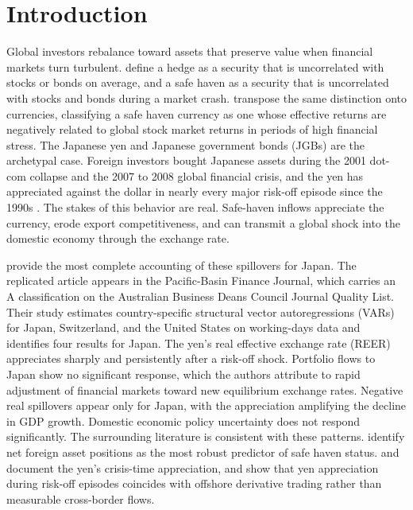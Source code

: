 \section{Introduction}

Global investors rebalance toward assets that preserve value when financial markets turn turbulent. \textcite{baur_lucey_2010} define a hedge as a security that is uncorrelated with stocks or bonds on average, and a safe haven as a security that is uncorrelated with stocks and bonds during a market crash. \textcite{hossfeld_macdonald_2014} transpose the same distinction onto currencies, classifying a safe haven currency as one whose effective returns are negatively related to global stock market returns in periods of high financial stress. The Japanese yen and Japanese government bonds (JGBs) are the archetypal case. Foreign investors bought Japanese assets during the 2001 dot-com collapse and the 2007 to 2008 global financial crisis, and the yen has appreciated against the dollar in nearly every major risk-off episode since the 1990s \parencite{beirne_sugandi_2023}. The stakes of this behavior are real. Safe-haven inflows appreciate the currency, erode export competitiveness, and can transmit a global shock into the domestic economy through the exchange rate.

\textcite{beirne_sugandi_2023} provide the most complete accounting of these spillovers for Japan. The replicated article appears in the Pacific-Basin Finance Journal, which carries an A classification on the Australian Business Deans Council Journal Quality List. Their study estimates country-specific structural vector autoregressions (VARs) for Japan, Switzerland, and the United States on working-days data and identifies four results for Japan. The yen's real effective exchange rate (REER) appreciates sharply and persistently after a risk-off shock. Portfolio flows to Japan show no significant response, which the authors attribute to rapid adjustment of financial markets toward new equilibrium exchange rates. Negative real spillovers appear only for Japan, with the appreciation amplifying the decline in GDP growth. Domestic economic policy uncertainty does not respond significantly. The surrounding literature is consistent with these patterns. \textcite{habib_stracca_2012} identify net foreign asset positions as the most robust predictor of safe haven status. \textcite{ranaldo_soderlind_2010} and \textcite{fatum_yamamoto_2015} document the yen's crisis-time appreciation, and \textcite{botman_carvalho_lam_2013} show that yen appreciation during risk-off episodes coincides with offshore derivative trading rather than measurable cross-border flows.

